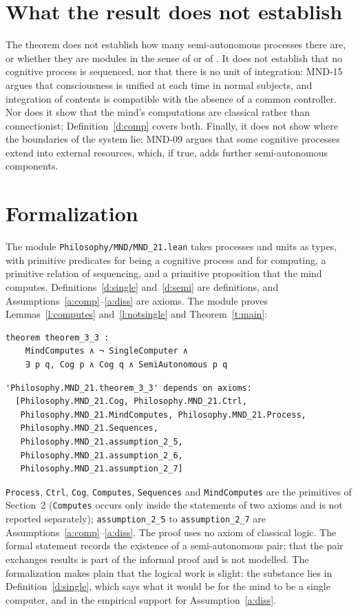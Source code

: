 \documentclass{situationist-preprint}
\begin{document}
\section{What the result does not establish}

The theorem does not establish how many semi-autonomous processes there are, or whether they are modules in the sense of \citet{Fodor1983} or of \citet{Carruthers2006}. It does not establish that no cognitive process is sequenced, nor that there is no unit of integration: MND-15 argues that consciousness is unified at each time in normal subjects, and integration of contents is compatible with the absence of a common controller. Nor does it show that the mind's computations are classical rather than connectionist; Definition~\ref{d:comp} covers both. Finally, it does not show where the boundaries of the system lie; MND-09 argues that some cognitive processes extend into external resources, which, if true, adds further semi-autonomous components.

\section{Formalization}

The module \nolinkurl{Philosophy/MND/MND_21.lean} takes processes and units as types, with primitive predicates for being a cognitive process and for computing, a primitive relation of sequencing, and a primitive proposition that the mind computes. Definitions~\ref{d:single} and~\ref{d:semi} are definitions, and Assumptions~\ref{a:comp}--\ref{a:diss} are axioms. The module proves Lemmas~\ref{l:computes} and~\ref{l:notsingle} and Theorem~\ref{t:main}:

\begin{lstlisting}
theorem theorem_3_3 :
    MindComputes ∧ ¬ SingleComputer ∧
    ∃ p q, Cog p ∧ Cog q ∧ SemiAutonomous p q
\end{lstlisting}

\begin{lstlisting}
'Philosophy.MND_21.theorem_3_3' depends on axioms:
  [Philosophy.MND_21.Cog, Philosophy.MND_21.Ctrl,
   Philosophy.MND_21.MindComputes, Philosophy.MND_21.Process,
   Philosophy.MND_21.Sequences,
   Philosophy.MND_21.assumption_2_5,
   Philosophy.MND_21.assumption_2_6,
   Philosophy.MND_21.assumption_2_7]
\end{lstlisting}

\texttt{Process}, \texttt{Ctrl}, \texttt{Cog}, \texttt{Computes}, \texttt{Sequences} and \texttt{MindComputes} are the primitives of Section~2 (\texttt{Computes} occurs only inside the statements of two axioms and is not reported separately); \texttt{assumption\_2\_5} to \texttt{assumption\_2\_7} are Assumptions~\ref{a:comp}--\ref{a:diss}. The proof uses no axiom of classical logic. The formal statement records the existence of a semi-autonomous pair; that the pair exchanges results is part of the informal proof and is not modelled. The formalization makes plain that the logical work is slight: the substance lies in Definition~\ref{d:single}, which says what it would be for the mind to be a single computer, and in the empirical support for Assumption~\ref{a:diss}.
\end{document}
